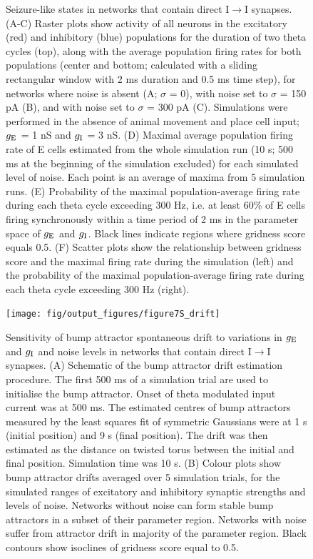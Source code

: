 \documentclass[a4paper,12pt]{article}
\newcommand{\ssc}[3]{\ensuremath{#1_{\text{#2}_{\text{#3}}}}}
\newcommand{\gE      }{\ssc{g}      {\scriptsize{E}}{}}
\newcommand{\gI      }{\ssc{g}      {\scriptsize{I}}{}}
\begin{document}
\begin{figure}[H]
    \internallinenumbers
    \caption{Seizure-like states in networks that contain direct
    I$\rightarrow$I synapses. (A-C) Raster plots show activity of all neurons
    in the excitatory (red) and inhibitory (blue) populations for the duration
    of two theta cycles (top), along with the average population firing rates
    for both populations (center and bottom; calculated with a sliding
    rectangular window with 2 ms duration and 0.5 ms time step), for networks
    where noise is absent (A; $\sigma$ = 0), with noise set to $\sigma$ = 150
    pA (B), and with noise set to $\sigma$ = 300 pA (C). Simulations were
    performed in the absence of animal movement and place cell input; $\gE$ = 1 nS
    and $\gI$ = 3 nS.  (D) Maximal average population firing rate of E cells
    estimated from the whole simulation run (10 s; 500 ms at the beginning of
    the simulation excluded) for each simulated level of noise. Each point is
    an average of maxima from 5 simulation runs.  (E) Probability of the
    maximal population-average firing rate during each theta cycle exceeding
    300 Hz, i.e. at least 60\% of E cells firing synchronously within a time
    period of 2 ms in the parameter space of $\gE$ and $\gI$. Black lines
    indicate regions where gridness score equals 0.5. (F) Scatter plots show
    the relationship between gridness score and the maximal firing rate during
    the simulation (left) and the probability of the maximal population-average
    firing rate during each theta cycle exceeding 300 Hz (right).}
\end{figure}

\clearpage

\begin{figure}[ht!]
    \internallinenumbers
    \centering
        \texttt{[image: fig/output\_figures/figure7S\_drift]}
    \caption{Sensitivity of bump attractor spontaneous drift to variations in
    $\gE$ and $\gI$ and noise levels in networks that contain direct
    I$\rightarrow$I synapses. (A) Schematic of the bump attractor drift
    estimation procedure. The first 500 ms of a simulation trial are used to
    initialise the bump attractor. Onset of theta modulated input current was
    at 500 ms.  The estimated centres of bump attractors measured by the least
    squares fit of symmetric Gaussians were at 1 s (initial position) and 9 s
    (final position). The drift was then estimated as the distance on twisted
    torus between the initial and final position. Simulation time was 10 s. (B)
    Colour plots show bump attractor drifts averaged over 5 simulation trials,
    for the simulated ranges of excitatory and inhibitory synaptic strengths
    and levels of noise.  Networks without noise can form stable bump
    attractors in a subset of their parameter region. Networks with noise
    suffer from attractor drift in majority of the parameter region. Black
    contours show isoclines of gridness score equal to 0.5.}
\end{figure}
\end{document}
